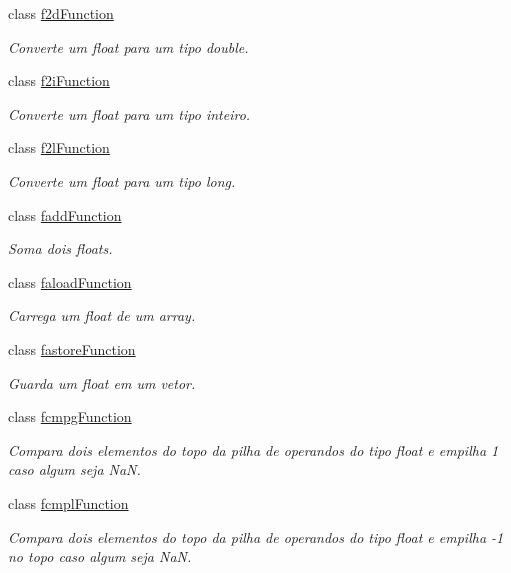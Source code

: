 \begin{DoxyCompactItemize}
class \hyperlink{classInstruction_1_1f2dFunction}{f2d\+Function}
\begin{DoxyCompactList}\small\item\em Converte um float para um tipo double. \end{DoxyCompactList}\item 
class \hyperlink{classInstruction_1_1f2iFunction}{f2i\+Function}
\begin{DoxyCompactList}\small\item\em Converte um float para um tipo inteiro. \end{DoxyCompactList}\item 
class \hyperlink{classInstruction_1_1f2lFunction}{f2l\+Function}
\begin{DoxyCompactList}\small\item\em Converte um float para um tipo long. \end{DoxyCompactList}\item 
class \hyperlink{classInstruction_1_1faddFunction}{fadd\+Function}
\begin{DoxyCompactList}\small\item\em Soma dois floats. \end{DoxyCompactList}\item 
class \hyperlink{classInstruction_1_1faloadFunction}{faload\+Function}
\begin{DoxyCompactList}\small\item\em Carrega um float de um array. \end{DoxyCompactList}\item 
class \hyperlink{classInstruction_1_1fastoreFunction}{fastore\+Function}
\begin{DoxyCompactList}\small\item\em Guarda um float em um vetor. \end{DoxyCompactList}\item 
class \hyperlink{classInstruction_1_1fcmpgFunction}{fcmpg\+Function}
\begin{DoxyCompactList}\small\item\em Compara dois elementos do topo da pilha de operandos do tipo float e empilha 1 caso algum seja NaN. \end{DoxyCompactList}\item 
class \hyperlink{classInstruction_1_1fcmplFunction}{fcmpl\+Function}
\begin{DoxyCompactList}\small\item\em Compara dois elementos do topo da pilha de operandos do tipo float e empilha -\/1 no topo caso algum seja NaN. \end{DoxyCompactList}\item 

\end{DoxyCompactItemize}
